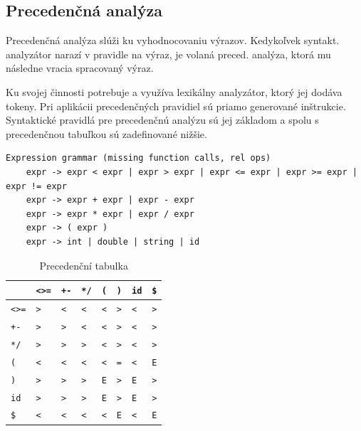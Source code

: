 \documentclass[12pt,a4paper,titlepage,final]{article}
\begin{document}
\subsection{Precedenčná analýza}

Precedenčná analýza slúži ku vyhodnocovaniu výrazov. Kedykoľvek syntakt. analyzátor narazí v pravidle na výraz, je volaná preced. analýza, ktorá mu následne vracia spracovaný výraz. 

Ku svojej činnosti potrebuje a využíva lexikálny analyzátor, ktorý jej dodáva tokeny. Pri aplikácii precedenčných pravidiel sú priamo generované inštrukcie. Syntaktické pravidlá pre precedenčnú analýzu sú jej základom a spolu s precedenčnou tabuľkou sú zadefinované nižšie. 
\begin{verbatim}
Expression grammar (missing function calls, rel ops)
	expr -> expr < expr | expr > expr | expr <= expr | expr >= expr | expr != expr
	expr -> expr + expr | expr - expr
	expr -> expr * expr | expr / expr
	expr -> ( expr )
	expr -> int | double | string | id
\end{verbatim}

\begin{table}
\begin{center}
\begin{tabular}{ | l | l | l | l | l | l | l | l |  }
\hline
            & \verb+<>=+& \verb;+-; & \verb+*/+ & \verb+(+  & \verb+)+  & \verb+id+ & \verb+$+ \\ \hline
\verb+<>=+  & \verb+>+  & \verb+<+  & \verb+<+  & \verb+<+  & \verb+>+  & \verb+<+  & \verb+>+ \\ \hline
\verb;+-;   & \verb;>;  & \verb;>;  & \verb;<;  & \verb;<;  & \verb;>;  & \verb;<;  & \verb;>; \\ \hline
\verb;*/;   & \verb;>;  & \verb;>;  & \verb;>;  & \verb;<;  & \verb;>;  & \verb;<;  & \verb;>; \\ \hline
\verb;(;    & \verb;<;  & \verb;<;  & \verb;<;  & \verb;<;  & \verb;=;  & \verb;<;  & \verb;E; \\ \hline
\verb;);    & \verb;>;  & \verb;>;  & \verb;>;  & \verb;E;  & \verb;>;  & \verb;E;  & \verb;>; \\ \hline
\verb;id;   & \verb;>;  & \verb;>;  & \verb;>;  & \verb;E;  & \verb;>;  & \verb;E;  & \verb;>; \\ \hline
\verb;$;    & \verb;<;  & \verb;<;  & \verb;<;  & \verb;<;  & \verb;E;  & \verb;<;  & \verb;E; \\ \hline

\end{tabular}
\caption{Precedenční tabulka}
\label{table:prec}
\end{center}
\end{table}
\end{document}
